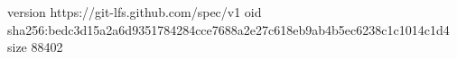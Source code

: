 version https://git-lfs.github.com/spec/v1
oid sha256:bedc3d15a2a6d9351784284cce7688a2e27c618eb9ab4b5ec6238c1c1014c1d4
size 88402
